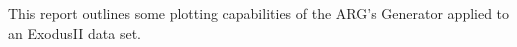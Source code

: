 This report outlines some plotting capabilities of the ARG's Generator applied to an ExodusII data set.
